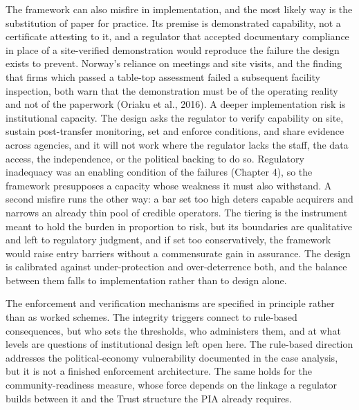 \documentclass[twoside,fontset=lmodern]{mitthesis}
\begin{document}
The framework can also misfire in implementation, and the most likely
way is the substitution of paper for practice. Its premise is
demonstrated capability, not a certificate attesting to it, and a
regulator that accepted documentary compliance in place of a
site-verified demonstration would reproduce the failure the design
exists to prevent. Norway's reliance on meetings and site visits, and
the finding that firms which passed a table-top assessment failed a
subsequent facility inspection, both warn that the demonstration must be
of the operating reality and not of the paperwork (Oriaku et al., 2016).
A deeper implementation risk is institutional capacity. The design asks
the regulator to verify capability on site, sustain post-transfer
monitoring, set and enforce conditions, and share evidence across
agencies, and it will not work where the regulator lacks the staff, the
data access, the independence, or the political backing to do so.
Regulatory inadequacy was an enabling condition of the failures (Chapter
4), so the framework presupposes a capacity whose weakness it must also
withstand. A second misfire runs the other way: a bar set too high
deters capable acquirers and narrows an already thin pool of credible
operators. The tiering is the instrument meant to hold the burden in
proportion to risk, but its boundaries are qualitative and left to
regulatory judgment, and if set too conservatively, the framework would
raise entry barriers without a commensurate gain in assurance. The
design is calibrated against under-protection and over-deterrence both,
and the balance between them falls to implementation rather than to
design alone.

The enforcement and verification mechanisms are specified in principle
rather than as worked schemes. The integrity triggers connect to
rule-based consequences, but who sets the thresholds, who administers
them, and at what levels are questions of institutional design left open
here. The rule-based direction addresses the political-economy
vulnerability documented in the case analysis, but it is not a finished
enforcement architecture. The same holds for the community-readiness
measure, whose force depends on the linkage a regulator builds between
it and the Trust structure the PIA already requires.
\end{document}
